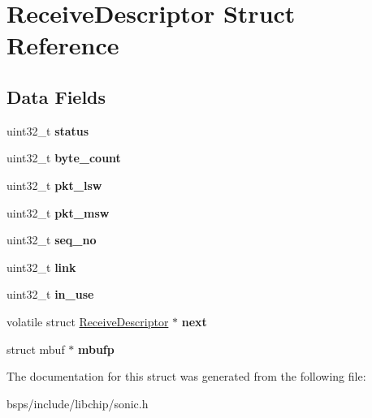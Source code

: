 \hypertarget{structReceiveDescriptor}{}\section{Receive\+Descriptor Struct Reference}
\label{structReceiveDescriptor}
\subsection*{Data Fields}
\begin{DoxyCompactItemize}
\item 
\mbox{\label{structReceiveDescriptor_a85db8044b6bce59ece7aabf985f72416}} 
uint32\+\_\+t {\bfseries status}
\item 
\mbox{\label{structReceiveDescriptor_a9643966580ee305d34136f624b051de6}} 
uint32\+\_\+t {\bfseries byte\+\_\+count}
\item 
\mbox{\label{structReceiveDescriptor_a8b1a8b18f1ba508f44b1bba3e6c85b7b}} 
uint32\+\_\+t {\bfseries pkt\+\_\+lsw}
\item 
\mbox{\label{structReceiveDescriptor_a80ec666a5245bd4052a99d83ff452fc1}} 
uint32\+\_\+t {\bfseries pkt\+\_\+msw}
\item 
\mbox{\label{structReceiveDescriptor_a905b9d7e1f4d94681f103c81bcdba795}} 
uint32\+\_\+t {\bfseries seq\+\_\+no}
\item 
\mbox{\label{structReceiveDescriptor_a6bd0899cdca4f4e541dee3c337eeb25c}} 
uint32\+\_\+t {\bfseries link}
\item 
\mbox{\label{structReceiveDescriptor_a09bdea99c521fb33cbc17870627daa5f}} 
uint32\+\_\+t {\bfseries in\+\_\+use}
\item 
\mbox{\label{structReceiveDescriptor_a91818d5c11dbd98eac74523a02c47ae1}} 
volatile struct \mbox{\hyperlink{structReceiveDescriptor}{Receive\+Descriptor}} $\ast$ {\bfseries next}
\item 
\mbox{\label{structReceiveDescriptor_a4dc8dc7dcc74dd139fac463c1037afa3}} 
struct mbuf $\ast$ {\bfseries mbufp}
\end{DoxyCompactItemize}


The documentation for this struct was generated from the following file\+:\begin{DoxyCompactItemize}
\item 
bsps/include/libchip/sonic.\+h\end{DoxyCompactItemize}
